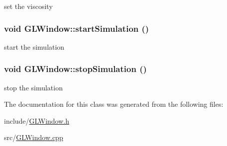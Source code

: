 set the viscosity \hypertarget{classGLWindow_a9d5782bf444d2f14c3244ca295b63545}{
\subsubsection[{startSimulation}]{\setlength{\rightskip}{0pt plus 5cm}void GLWindow::startSimulation ()}}
\label{classGLWindow_a9d5782bf444d2f14c3244ca295b63545}


start the simulation \hypertarget{classGLWindow_a2fe0c3f972cf0614b6b90e43724160f8}{
\subsubsection[{stopSimulation}]{\setlength{\rightskip}{0pt plus 5cm}void GLWindow::stopSimulation ()}}
\label{classGLWindow_a2fe0c3f972cf0614b6b90e43724160f8}


stop the simulation 

The documentation for this class was generated from the following files:\begin{DoxyCompactItemize}
\item 
include/\hyperlink{GLWindow_8h}{GLWindow.h}\item 
src/\hyperlink{GLWindow_8cpp}{GLWindow.cpp}\end{DoxyCompactItemize}
